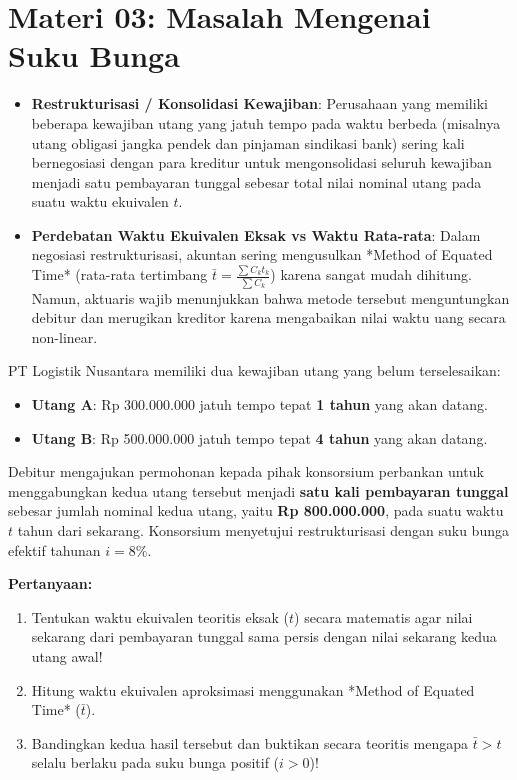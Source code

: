 \documentclass[11pt,a4paper]{article}
\begin{document}
\newpage

\section*{Materi 03: Masalah Mengenai Suku Bunga}

\begin{kasusbox}
\begin{itemize}[leftmargin=4mm, topsep=1pt, itemsep=1pt]
    \item \textbf{Restrukturisasi / Konsolidasi Kewajiban}: Perusahaan yang memiliki beberapa kewajiban utang yang jatuh tempo pada waktu berbeda (misalnya utang obligasi jangka pendek dan pinjaman sindikasi bank) sering kali bernegosiasi dengan para kreditur untuk mengonsolidasi seluruh kewajiban menjadi satu pembayaran tunggal sebesar total nilai nominal utang pada suatu waktu ekuivalen $t$.
    \item \textbf{Perdebatan Waktu Ekuivalen Eksak vs Waktu Rata-rata}: Dalam negosiasi restrukturisasi, akuntan sering mengusulkan *Method of Equated Time* (rata-rata tertimbang $\bar{t} = \frac{\sum C_k t_k}{\sum C_k}$) karena sangat mudah dihitung. Namun, aktuaris wajib menunjukkan bahwa metode tersebut menguntungkan debitur dan merugikan kreditor karena mengabaikan nilai waktu uang secara non-linear.
\end{itemize}
\end{kasusbox}

\begin{soalbox}
PT Logistik Nusantara memiliki dua kewajiban utang yang belum terselesaikan:
\begin{itemize}[leftmargin=4mm, topsep=1pt, itemsep=1pt]
    \item \textbf{Utang A}: Rp 300.000.000 jatuh tempo tepat \textbf{1 tahun} yang akan datang.
    \item \textbf{Utang B}: Rp 500.000.000 jatuh tempo tepat \textbf{4 tahun} yang akan datang.
\end{itemize}
Debitur mengajukan permohonan kepada pihak konsorsium perbankan untuk menggabungkan kedua utang tersebut menjadi \textbf{satu kali pembayaran tunggal} sebesar jumlah nominal kedua utang, yaitu \textbf{Rp 800.000.000}, pada suatu waktu $t$ tahun dari sekarang. Konsorsium menyetujui restrukturisasi dengan suku bunga efektif tahunan $i = 8\%$.

\textbf{Pertanyaan:}
\begin{enumerate}[label=(\alph*), topsep=1pt, itemsep=1pt]
    \item Tentukan waktu ekuivalen teoritis eksak ($t$) secara matematis agar nilai sekarang dari pembayaran tunggal sama persis dengan nilai sekarang kedua utang awal!
    \item Hitung waktu ekuivalen aproksimasi menggunakan *Method of Equated Time* ($\bar{t}$).
    \item Bandingkan kedua hasil tersebut dan buktikan secara teoritis mengapa $\bar{t} > t$ selalu berlaku pada suku bunga positif ($i > 0$)!
\end{enumerate}
\end{soalbox}
\end{document}
